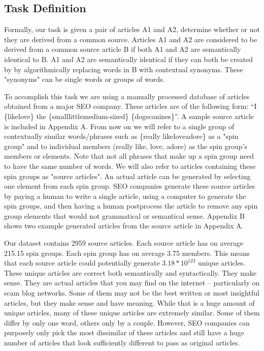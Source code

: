\documentclass[11pt,letterpaper,oneside, titlepage]{scrartcl}
\begin{document}
\subsection{Task Definition}

Formally, our task is given a pair of articles A1 and A2, determine whether or not they are derived from a common source. Articles A1 and A2 are considered to be derived from a common source article B if both A1 and A2 are semantically identical to B. A1 and A2 are semantically identical if they can both be created by by algorithmically replacing words in B with contextual synonyms. These "synonyms" can be single words or groups of words. 

To accomplish this task we are using a manually processed database of articles obtained from a major SEO company. These articles are of the following form: ``I \{like\textbar love\} the \{small\textbar little\textbar medium-sized\} \{dogs\textbar canines\}''. A sample source article is included in Appendix A. From now on we will refer to a single group of contextually similar words/phrases such as \{really like\textbar love\textbar adore\} as a "spin group" and to individual members (really like, love, adore) as the spin group's members or elements. Note that not all phrases that make up a spin group need to have the same number of words. We will also refer to articles containing these spin groups as "source articles". An actual article can be generated by selecting one element from each spin group. SEO companies generate these source articles by paying a human to write a single article, using a computer to generate the spin groups, and then having a human postprocess the article to remove any spin group elements that would not grammatical or semantical sense. Appendix B shows two example generated articles from the source article in Appendix A.

Our dataset contains 2959 source articles. Each source article has on average 215.15 spin groups. Each spin group has on average 3.75 members. This means that each source article could potentially generate $3.18*10^{123}$ unique articles. These unique articles are correct both semantically and syntactically. They make sense. They are actual articles that you may find on the internet – particularly on scam blog networks. Some of them may not be the best written or most insightful articles, but they make sense and have meaning.  While that is a huge amount of unique articles, many of these unique articles are extremely similar. Some of them differ by only one word, others only by a couple. However, SEO companies can purposely only pick the most dissimilar of these articles and still have a huge number of articles that look sufficiently different to pass as original articles.
\end{document}
